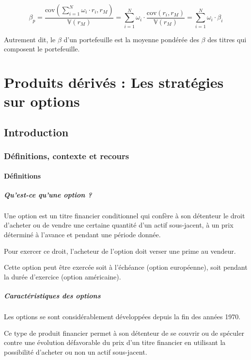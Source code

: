 \documentclass[a4paper, 12pt]{report}
\begin{document}
\[
\beta_p = \frac{\text{cov}\left(\sum_{i=1}^{N} \omega_i \cdot r_i, r_M\right)}{\mathbb{V}(r_M)} = \sum_{i=1}^{N} \omega_i \cdot \frac{\text{cov}(r_i, r_M)}{\mathbb{V}(r_M)} = \sum_{i=1}^{N} \omega_i \cdot \beta_i
\]

Autrement dit, le \( \beta \) d'un portefeuille est la moyenne pondérée des \( \beta \) des titres qui composent le portefeuille.

\chapter{Produits dérivés : Les stratégies sur options}

\section{Introduction}

\subsection{Définitions, contexte et recours}

\subsubsection{Définitions}

\paragraph{Qu’est-ce qu’une option ?}

Une option est un titre financier conditionnel qui confère à son détenteur le droit d’acheter ou de vendre une certaine quantité d’un actif sous-jacent, à un prix déterminé à l’avance et pendant une période donnée.

Pour exercer ce droit, l’acheteur de l’option doit verser une prime au vendeur.

Cette option peut être exercée soit à l’échéance (option européenne), soit pendant la durée d’exercice (option américaine).

\paragraph{Caractéristiques des options}

Les options se sont considérablement développées depuis la fin des années 1970.

Ce type de produit financier permet à son détenteur de se couvrir ou de spéculer contre une évolution défavorable du prix d’un titre financier en utilisant la possibilité d’acheter ou non un actif sous-jacent.
\end{document}

